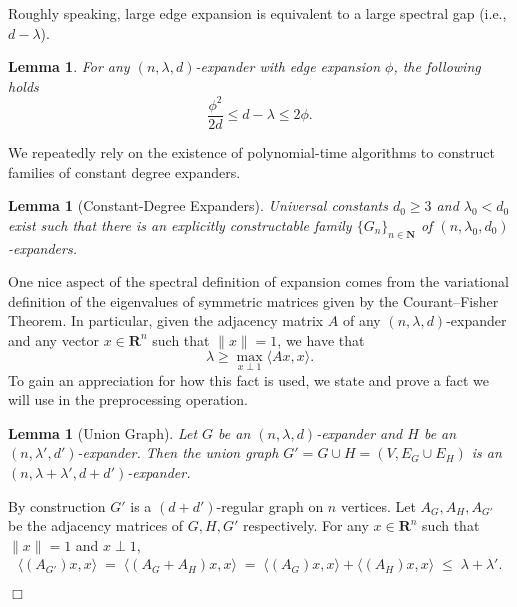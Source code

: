 \documentclass{article}
\newtheorem{lemma}[theorem]{Lemma}
\newenvironment{proof}{\noindent{\bf Proof:} \hspace*{1mm}}{
	\hspace*{\fill} $\Box$ }
\newcommand{\N}{{\mathbf N}}
\newcommand{\R}{{\mathbf R}}
\begin{document}
Roughly speaking, large edge expansion is equivalent to a large spectral gap (i.e., $d - \lambda$).

\begin{lemma}%
For any $(n, \lambda, d)$-expander with edge expansion $\phi$, the following holds
$$
\frac{\phi^2}{2d} \le d - \lambda \le 2\phi.
$$
\end{lemma}

We repeatedly rely on the existence of polynomial-time algorithms
to construct families of constant degree expanders.

\begin{lemma}[Constant-Degree Expanders]\label{expandersexist}
Universal constants $d_0 \ge 3$ and $\lambda_0<d_0$ exist such that there
is an explicitly constructable %
family $\{G_n\}_{n\in \N}$ of $(n, \lambda_0, d_0)$-expanders.%
\end{lemma}

One nice aspect of the spectral definition of
expansion comes from the variational definition of the eigenvalues
of symmetric matrices given by the Courant--Fisher Theorem.
In particular, given the adjacency matrix $A$ of any $(n, \lambda, d)$-expander
and any vector $x \in \R^n$ such that $\|x\| = 1$, we have that
$$
\lambda \ge \max_{x \perp 1} \langle Ax, x\rangle. %
$$
To gain an appreciation for how this fact is used, we state and prove a
fact we will use in the preprocessing operation.

\begin{lemma}[Union Graph]\label{union}
Let $G$ be an $(n, \lambda, d)$-expander and $H$ be an $(n, \lambda', d')$-expander.
Then the \emph{union graph} $G' = G \cup H = (V, E_G \cup E_H)$ is an
$(n, \lambda + \lambda', d+d')$-expander.
\end{lemma}

\begin{proof}
By construction $G'$ is a $(d+d')$-regular graph on $n$ vertices.
Let $A_G, A_H, A_{G'}$ be the adjacency matrices of $G, H, G'$ respectively.
For any $x \in \R^n$ such that $\|x\| = 1$ and $x \perp 1$,
\begin{align*}
\langle (A_{G'})x, x\rangle
  \;=\; \langle (A_G+A_H)x, x\rangle
  \;=\; \langle (A_G)x, x\rangle + \langle (A_H)x, x\rangle
  \;\le\; \lambda + \lambda'.%
\end{align*}
\end{proof}
\end{document}
